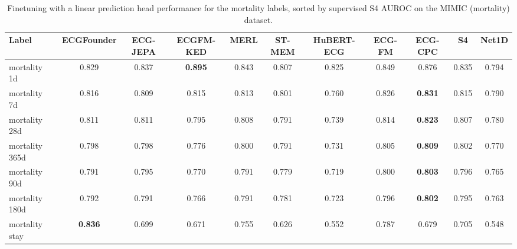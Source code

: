 \documentclass{article}
\begin{document}
                \begin{table}[htbp]
                    \centering
                    \tiny
                    \setlength{\tabcolsep}{2pt}
                    \caption{Finetuning with a linear prediction head performance for the mortality labels, sorted by supervised S4 AUROC on the MIMIC (mortality) dataset.}
                    \begin{tabular}{lcccccccccc}
                        \toprule
                        \textbf{Label} & \textbf{ECGFounder} & \textbf{ECG-JEPA} & \textbf{ECGFM-KED} & \textbf{MERL} & \textbf{ST-MEM} & \textbf{HuBERT-ECG} & \textbf{ECG-FM} & \textbf{ECG-CPC} & \textbf{S4} & \textbf{Net1D} \\
                        \midrule
                        mortality 1d & 0.829 & 0.837 & \textbf{0.895} & 0.843 & 0.807 & 0.825 & 0.849 & 0.876 & 0.835 & 0.794 \\
                        mortality 7d & 0.816 & 0.809 & 0.815 & 0.813 & 0.801 & 0.760 & 0.826 & \textbf{0.831} & 0.815 & 0.790 \\
                        mortality 28d & 0.811 & 0.811 & 0.795 & 0.808 & 0.791 & 0.739 & 0.814 & \textbf{0.823} & 0.807 & 0.780 \\
                        mortality 365d & 0.798 & 0.798 & 0.776 & 0.800 & 0.791 & 0.731 & 0.805 & \textbf{0.809} & 0.802 & 0.770 \\
                        mortality 90d & 0.791 & 0.795 & 0.770 & 0.791 & 0.779 & 0.719 & 0.800 & \textbf{0.803} & 0.796 & 0.765 \\
                        mortality 180d & 0.792 & 0.791 & 0.766 & 0.791 & 0.781 & 0.723 & 0.796 & \textbf{0.802} & 0.795 & 0.763 \\
                        mortality stay & \textbf{0.836} & 0.699 & 0.671 & 0.755 & 0.626 & 0.552 & 0.787 & 0.679 & 0.705 & 0.548 \\
                        \bottomrule
                    \end{tabular}
                    \label{tab:results_overview_mortality}
                \end{table}
\end{document}
